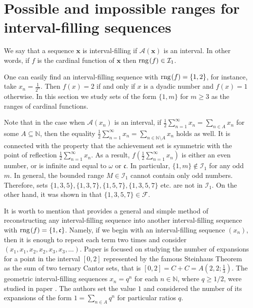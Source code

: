 \documentclass{amsart}
\theoremstyle{definition}
\newcommand{\rng}{{\rm rng} \hspace{0.03cm}}
\begin{document}
\section{Possible and impossible ranges for interval-filling sequences}

We say that a sequence $\mathbf{x}$ is interval-filling if $\mathcal{A}(\mathbf{x})$ is an interval. In other words, if $f$ is the cardinal function of $\mathbf{x}$ then $\rng(f)\in\mathcal{I}_{1}$. 

One can easily find an interval-filling sequence with $\rng(f)=\{1,2\}$, for instance, take $x_n=\frac{1}{2^n}$. Then $f(x)=2$ if and only if $x$ is a dyadic number and $f(x)=1$ otherwise. In this section we study sets of the form $\{1,m\}$ for $m\geq 3$ as the ranges of cardinal functions.

Note that in the case when $\mathcal{A}(x_n)$ is an interval, if $\frac{1}{2}\sum_{n=1}^{\infty} x_n=\sum_{n\in A} x_n$ for some $A\subseteq\mathbb{N}$, then the equality $\frac{1}{2}\sum_{n=1}^{\infty} x_n=\sum_{n\in\mathbb{N}\setminus A} x_n$ holds as well. It is connected with the property that the achievement set is symmetric with the point of reflection $\frac{1}{2}\sum_{n=1}^{\infty} x_n$. As a result, $f(\frac{1}{2}\sum_{n=1}^{\infty} x_n)$ is either an even number, or is infinite and equal to $\omega$ or $\mathfrak{c}$. In particular, $\{1,m\}\notin \mathcal{I}_1$ for any odd $m$. In general, the bounded range $M\in \mathcal{I}_1$ cannot contain only odd numbers. Therefore, sets $\{1,3,5\}, \{1,3,7\},\{1,5,7\},\{1,3,5,7\}$ etc. are not in $\mathcal{I}_1$. On the other hand, it was shown in \cite[Example 4.19]{cardfun} that $\{1,3,5,7\}\in \mathcal{F}$.

It is worth to mention that \cite[Corolary 2.11]{cardfun} provides a general and simple method of reconstructing any interval-filling sequence into another interval-filling sequence with $\rng(f)=\{1,\mathfrak{c}\}$. Namely, if we begin with an interval-filling sequence $(x_{n})$, then it is enough to repeat each term two times and consider $(x_1,x_1,x_2,x_2,x_3,x_3,\ldots)$. Paper \cite{Nymann} is focused on studying the number of expansions for a point in the interval $[0,2]$ represented by the famous Steinhaus Theorem as the sum of two ternary Cantor sets, that is $[0,2]=C+C=A(2,2;\frac{1}{3})$. The geometric interval-filling sequences $x_n = q^n$ for each $n \in \mathbb{N}$, where $q\geq 1/2$, were studied in paper \cite{Erdos}. The authors set the value $1$ and considered the number of its expansions of the form $1=\sum_{n\in A}q^{n}$ for particular ratios $q$. 
\end{document}
